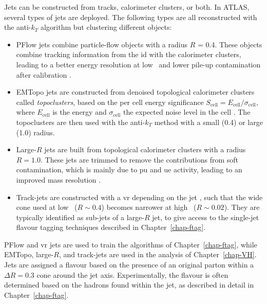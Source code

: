 Jets can be constructed from tracks, calorimeter clusters, or both. In ATLAS, several types of jets are deployed. The following types are all reconstructed with the anti-$k_T$ algorithm but clustering different objects:
\begin{itemize}[leftmargin=*]
\item PFlow jets combine particle-flow objects \cite{atlasPFLOWjet} with a radius $R$ = 0.4. These objects combine tracking information from the \gls{id} with the calorimeter clusters, leading to a better energy resolution at low \pt\ and lower pile-up contamination after calibration \cite{PhysRevD.96.072002}.
\item EMTopo jets are constructed from denoised topological calorimeter clusters called \textit{topoclusters}, based on the per cell energy significance $S_{\text{cell}} = E_{\text{cell}} / \sigma_{\text{cell}}$, where $E_{\text{cell}}$ is the energy and $\sigma_{\text{cell}}$ the expected noise level in the cell \cite{atlasEMTOpo}. The topoclusters are then used with the anti-$k_T$ method with a small (0.4) or large (1.0) radius.
\item Large-$R$ jets are built from topological calorimeter clusters with a radius $R = 1.0$. These jets are trimmed to remove the contributions from soft contamination, which is mainly due to \gls{pu} and \gls{ue} activity, leading to an improved mass resolution \cite{ATLAS:largeRjet}.
\item Track-jets are constructed with a \gls{vr} depending on the jet \pt, such that the wide cone used at low \pt\ ($R \sim 0.4$) becomes narrower at high \pt\ ($R \sim 0.02$). They are typically identified as sub-jets of a large-$R$ jet, to give access to the single-jet flavour tagging techniques described in Chapter~\ref{chap-ftag}.
\end{itemize}
PFlow and \gls{vr} jets are used to train the algorithms of Chapter~\ref{chap-ftag}, while EMTopo, large-$R$, and track-jets are used in the analysis of Chapter~\ref{chap-VH}. Jets are assigned a flavour based on the presence of an original parton within a $\Delta R = 0.3$ cone around the jet axis. Experimentally, the flavour is often determined based on the hadrons found within the jet, as described in detail in Chapter~\ref{chap-ftag}. \\

